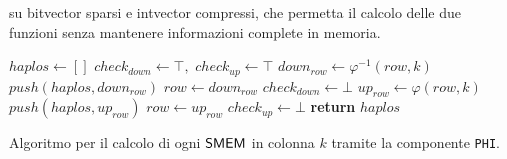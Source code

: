 su bitvector sparsi e intvector compressi, che permetta il calcolo
delle due funzioni senza mantenere informazioni complete in memoria. 
\begin{algorithm}
  \small
  \begin{algorithmic}[1]
    \State $haplos\gets []$
    \State $check_{down}\gets \top,\,\,check_{up}\gets \top$
    \State $down_{row}\gets \varphi^{-1}(row, k)$
    \State $push(haplos, down_{row})$
    \State $row \gets down_{row}$
    \Else
    \State $check_{down}\gets \bot$
    \EndIf
    \EndWhile
    \State $up_{row}\gets \varphi(row, k)$
    \State $push(haplos, up_{row})$
    \State $row \gets up_{row}$
    \Else
    \State $check_{up}\gets \bot$
    \EndIf
    \EndWhile
    \State \textbf{return} $haplos$
    \EndFunction
  \end{algorithmic}
  \caption{\footnotesize{Algoritmo per il calcolo di ogni $\mbox{\rm {\sf SMEM}}$ in colonna $k$
  tramite la 
  componente \texttt{PHI}.}}
  \label{algo:phiext}
\end{algorithm}
